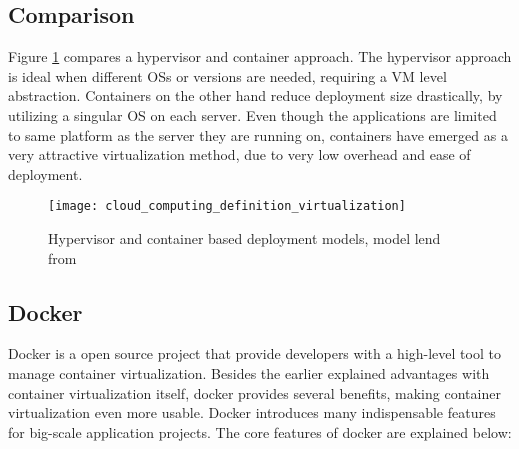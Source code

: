\subsection{Comparison}
Figure \ref{fig:cloud_computing_definition_virtualization} compares a hypervisor and container approach. The hypervisor approach is ideal when different OSs or versions are needed, requiring a VM level abstraction\cite{bernstein2014containers}. Containers on the other hand reduce deployment size drastically, by utilizing a singular OS on each server. Even though the applications are limited to same platform as the server they are running on, containers have emerged as a very attractive virtualization method, due to very low overhead and ease of deployment\cite{fink2014docker}.

\begin{figure}[!htb]
	\centering 
		 \texttt{[image: cloud\_computing\_definition\_virtualization]}  
	  \caption{Hypervisor and container based deployment models, model lend from \cite{bernstein2014containers}}
  \label{fig:cloud_computing_definition_virtualization}
\end{figure}


\subsection{Docker}
Docker is a open source project that provide developers with a high-level tool to manage container virtualization. Besides the earlier explained advantages with container virtualization itself, docker provides several benefits, making container virtualization even more usable. Docker introduces many indispensable features for big-scale application projects\cite{dockerFAQ}. The core features of docker are explained below:

